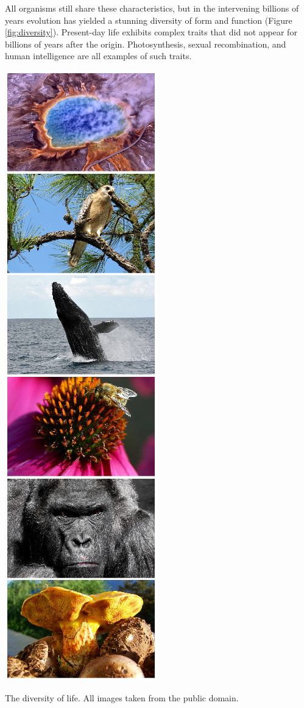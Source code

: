 \documentclass{tufte-book} %
\begin{document}

All organisms still share these characteristics, but in the intervening billions of years evolution has yielded a stunning diversity of form and function (Figure \ref{fig:diversity}). Present-day life exhibits complex traits that did not appear for billions of years after the origin. Photosynthesis, sexual recombination, and human intelligence are all examples of such traits.

\begin{marginfigure}
\includegraphics[width=\linewidth]{graphics/diversity-composite.jpg}
\caption{The diversity of life. All images taken from the public domain.}
\label{fig:diversity}
\end{marginfigure}
\end{document}
